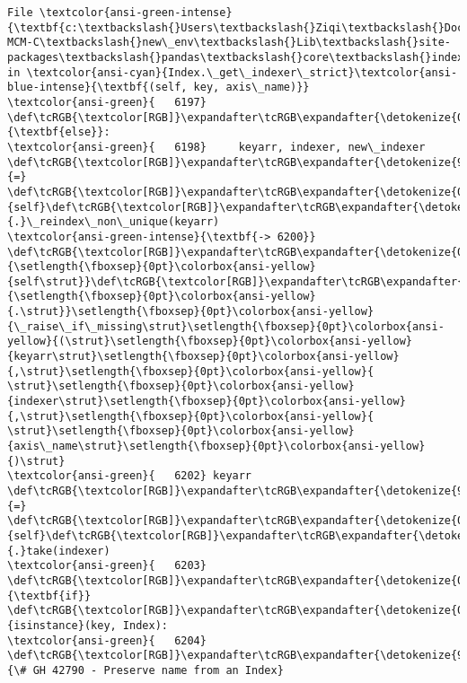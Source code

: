 \documentclass[11pt]{article}
\begin{document}
\begin{Verbatim}[commandchars=\\\{\}, frame=single, framerule=2mm, rulecolor=\color{outerrorbackground}]
File \textcolor{ansi-green-intense}{\textbf{c:\textbackslash{}Users\textbackslash{}Ziqi\textbackslash{}Documents\textbackslash{}Python\textbackslash{}2025-MCM-C\textbackslash{}new\_env\textbackslash{}Lib\textbackslash{}site-packages\textbackslash{}pandas\textbackslash{}core\textbackslash{}indexes\textbackslash{}base.py:6200}}, in \textcolor{ansi-cyan}{Index.\_get\_indexer\_strict}\textcolor{ansi-blue-intense}{\textbf{(self, key, axis\_name)}}
\textcolor{ansi-green}{   6197} \def\tcRGB{\textcolor[RGB]}\expandafter\tcRGB\expandafter{\detokenize{0,135,0}}{\textbf{else}}:
\textcolor{ansi-green}{   6198}     keyarr, indexer, new\_indexer \def\tcRGB{\textcolor[RGB]}\expandafter\tcRGB\expandafter{\detokenize{98,98,98}}{=} \def\tcRGB{\textcolor[RGB]}\expandafter\tcRGB\expandafter{\detokenize{0,135,0}}{self}\def\tcRGB{\textcolor[RGB]}\expandafter\tcRGB\expandafter{\detokenize{98,98,98}}{.}\_reindex\_non\_unique(keyarr)
\textcolor{ansi-green-intense}{\textbf{-> 6200}} \def\tcRGB{\textcolor[RGB]}\expandafter\tcRGB\expandafter{\detokenize{0,135,0}}{\setlength{\fboxsep}{0pt}\colorbox{ansi-yellow}{self\strut}}\def\tcRGB{\textcolor[RGB]}\expandafter\tcRGB\expandafter{\detokenize{98,98,98}}{\setlength{\fboxsep}{0pt}\colorbox{ansi-yellow}{.\strut}}\setlength{\fboxsep}{0pt}\colorbox{ansi-yellow}{\_raise\_if\_missing\strut}\setlength{\fboxsep}{0pt}\colorbox{ansi-yellow}{(\strut}\setlength{\fboxsep}{0pt}\colorbox{ansi-yellow}{keyarr\strut}\setlength{\fboxsep}{0pt}\colorbox{ansi-yellow}{,\strut}\setlength{\fboxsep}{0pt}\colorbox{ansi-yellow}{ \strut}\setlength{\fboxsep}{0pt}\colorbox{ansi-yellow}{indexer\strut}\setlength{\fboxsep}{0pt}\colorbox{ansi-yellow}{,\strut}\setlength{\fboxsep}{0pt}\colorbox{ansi-yellow}{ \strut}\setlength{\fboxsep}{0pt}\colorbox{ansi-yellow}{axis\_name\strut}\setlength{\fboxsep}{0pt}\colorbox{ansi-yellow}{)\strut}
\textcolor{ansi-green}{   6202} keyarr \def\tcRGB{\textcolor[RGB]}\expandafter\tcRGB\expandafter{\detokenize{98,98,98}}{=} \def\tcRGB{\textcolor[RGB]}\expandafter\tcRGB\expandafter{\detokenize{0,135,0}}{self}\def\tcRGB{\textcolor[RGB]}\expandafter\tcRGB\expandafter{\detokenize{98,98,98}}{.}take(indexer)
\textcolor{ansi-green}{   6203} \def\tcRGB{\textcolor[RGB]}\expandafter\tcRGB\expandafter{\detokenize{0,135,0}}{\textbf{if}} \def\tcRGB{\textcolor[RGB]}\expandafter\tcRGB\expandafter{\detokenize{0,135,0}}{isinstance}(key, Index):
\textcolor{ansi-green}{   6204}     \def\tcRGB{\textcolor[RGB]}\expandafter\tcRGB\expandafter{\detokenize{95,135,135}}{\# GH 42790 - Preserve name from an Index}


\end{Verbatim}
\end{document}

